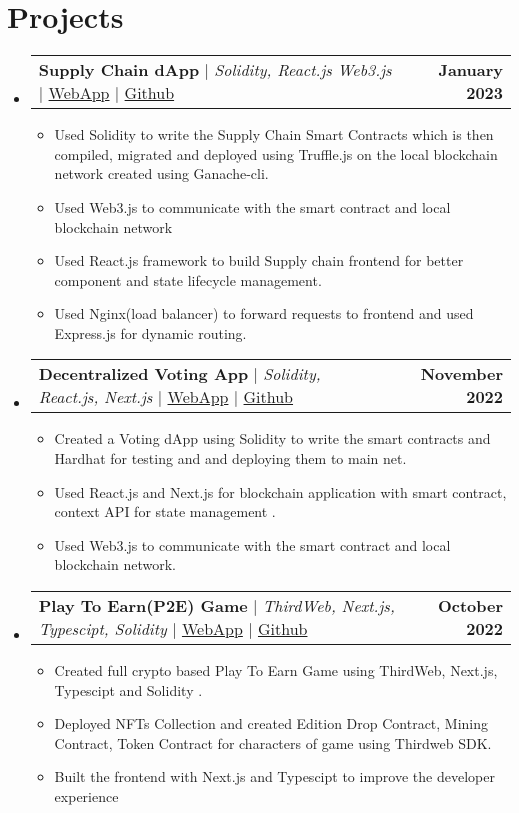 \documentclass[letterpaper,11pt]{article}
\makeatletter
\newcommand{\resumeItem}[1]{
  \item\small{
    {#1 \vspace{-2pt}}
  }
}
\newcommand{\resumeProjectHeading}[2]{
    \item
    \begin{tabular*}{1.001\textwidth}{l@{\extracolsep{\fill}}r}
      \small#1 & \textbf{\small #2}\\
    \end{tabular*}\vspace{-7pt}
}
\newcommand{\resumeSubHeadingListStart}{\begin{itemize}[leftmargin=0.0in, label={}]}
\newcommand{\resumeSubHeadingListEnd}{\end{itemize}}
\newcommand{\resumeItemListStart}{\begin{itemize}}
\newcommand{\resumeItemListEnd}{\end{itemize}\vspace{-5pt}}
\makeatother
\begin{document}
\section{Projects}
    \vspace{-5pt}
    \resumeSubHeadingListStart
      \resumeProjectHeading
          {\textbf{Supply Chain dApp} $|$ \emph{Solidity, React.js Web3.js} $|$ \href{}{WebApp} $|$ \href{}{Github}}{January 2023}
          \resumeItemListStart
            \resumeItem{Used Solidity to write the Supply Chain Smart Contracts which is then compiled, migrated and deployed using Truffle.js on the local blockchain network created using Ganache-cli.}
            \resumeItem{ Used Web3.js to communicate with the smart contract and local blockchain network}
            \resumeItem{Used React.js framework to build Supply chain frontend for better component and state lifecycle management.}
            \resumeItem{Used Nginx(load balancer) to forward requests to frontend and used Express.js for dynamic routing.}
          \resumeItemListEnd
          \vspace{-13pt}
      \resumeProjectHeading
          {\textbf{Decentralized Voting App} $|$ \emph{Solidity, React.js, Next.js} $|$ \href{}{WebApp} $|$ \href{}{Github}}{November 2022}
          \resumeItemListStart
            \resumeItem{Created a Voting dApp using Solidity to write the smart contracts and Hardhat for testing and and deploying them to main net.}
            \resumeItem{Used React.js and Next.js for blockchain application with smart contract, context API for state management .}
            \resumeItem{Used Web3.js to communicate with the smart contract and local blockchain network.}
          \resumeItemListEnd 
          \vspace{-13pt}
          \resumeProjectHeading
          {\textbf{Play To Earn(P2E) Game} $|$ \emph{ThirdWeb, Next.js, Typescipt, Solidity} $|$ \href{}{WebApp} $|$ \href{}{Github}}{October 2022}
          \resumeItemListStart
            \resumeItem{Created full crypto based Play To Earn Game using ThirdWeb, Next.js, Typescipt and Solidity .}
            \resumeItem{Deployed NFTs Collection and created Edition Drop Contract, Mining Contract, Token Contract for characters of game using Thirdweb SDK.}
            \resumeItem{Built the frontend with Next.js and Typescipt to improve the developer experience}
            
          \resumeItemListEnd 
    \resumeSubHeadingListEnd
\vspace{-15pt}
\end{document}
